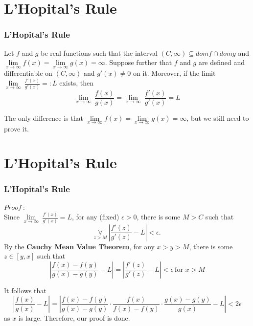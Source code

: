 \documentclass[12pt, t]{beamer}
\begin{document}
\section{L'Hopital's Rule}
\begin{frame}
    \frametitle{L'Hopital's Rule}
Let $f$ and $g$ be real functions such that the interval $(C,\infty)\subseteq domf\cap domg$ and 
$\underset{x\rightarrow \infty }{\lim}f(x)=\underset{x\rightarrow \infty }{\lim}g(x)=\infty$. Suppose further that $f$ and $g$ are defined 
and differentiable on $(C,\infty)$ and $g'(x)\neq 0$ on it. Moreover, if the limit $\underset{x\rightarrow \infty }{\lim}\ \frac{f'(x)}{g'(x)}=:L$ exists, then 
\begin{equation*}
    \underset{x\rightarrow\infty}{\lim}\ \frac{f(x)}{g(x)}=\underset{x\rightarrow\infty}{\lim}\ \frac{f'(x)}{g'(x)}=L
\end{equation*}

\vspace{0.5em}
\hspace{1em}
The only difference is that $\underset{x\rightarrow\infty}{\lim}f(x)=\underset{x\rightarrow \infty }{\lim}g(x)=\infty$, but we still need to 
prove it. 

    
\end{frame}

\section{L'Hopital's Rule}
\begin{frame}
    \frametitle{L'Hopital's Rule}
$Proof\ :$\\
\hspace{1em}
Since $\underset{x\rightarrow \infty }{\lim}\ \frac{f'(x)}{g'(x)}=L$, for any (fixed) $\epsilon>0$, there is some $M>C$ such that 
\begin{equation*}
    \underset{z>M}{\forall}\ |\frac{f'(z)}{g'(z)}-L|<\epsilon.
\end{equation*}
 By the \textbf{Cauchy Mean Value Theorem}, for any $x>y>M$, there is some $z\in[y,x]$ such that 
\begin{equation*}
    |\frac{f(x)-f(y)}{g(x)-g(y)}-L|=|\frac{f'(z)}{g'(z)}-L|<\epsilon\ \text{for }x>M
\end{equation*}

It follows that 
\begin{equation*}
    |\frac{f(x)}{g(x)}-L|=|\frac{f(x)-f(y)}{g(x)-g(y)}\cdot\frac{f(x)}{f(x)-f(y)}\cdot\frac{g(x)-g(y)}{g(x)}-L|<2\epsilon
\end{equation*}
as $x$ is large. Therefore, our proof is done.



\end{frame}
\end{document}
